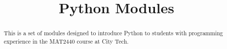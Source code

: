 \documentclass{xourse}
\title{Python Modules}
\begin{document}
  
\begin{abstract} %
This is a set of modules designed to introduce Python to students with programming experience in the MAT2440 course at City Tech.  
\end{abstract}  
\maketitle  
 
\end{document}
